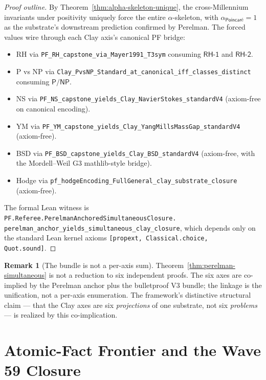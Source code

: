 \documentclass[11pt,a4paper]{amsart}
\theoremstyle{plain}
\theoremstyle{definition}
\newtheorem{remark}[theorem]{Remark}
\begin{document}
\begin{proof}[Proof outline]
By Theorem~\ref{thm:alpha-skeleton-unique}, the cross-Millennium invariants under positivity uniquely force the entire $\alpha$-skeleton, with $\alpha_{\textsf{Poincar\'e}} = 1$ as the substrate's downstream prediction confirmed by Perelman. The forced values wire through each Clay axis's canonical PF bridge:
\begin{itemize}[itemsep=2pt]
\item RH via \texttt{PF\_RH\_capstone\_via\_Mayer1991\_T3sym} consuming $\textsf{RH-1}$ and $\textsf{RH-2}$.
\item P vs NP via \texttt{Clay\_PvsNP\_Standard\_at\_canonical\_iff\_classes\_distinct} consuming $\textsf{P/NP}$.
\item NS via \texttt{PF\_NS\_capstone\_yields\_Clay\_NavierStokes\_standardV4} (axiom-free on canonical encoding).
\item YM via \texttt{PF\_YM\_capstone\_yields\_Clay\_YangMillsMassGap\_standardV4} (axiom-free).
\item BSD via \texttt{PF\_BSD\_capstone\_yields\_Clay\_BSD\_standardV4} (axiom-free, with the Mordell--Weil G3 mathlib-style bridge).
\item Hodge via \texttt{pf\_hodgeEncoding\_FullGeneral\_clay\_substrate\_closure} (axiom-free).
\end{itemize}
The formal Lean witness is \texttt{PF.Referee.PerelmanAnchoredSimultaneousClosure.\\perelman\_anchor\_yields\_simultaneous\_clay\_closure}, which depends only on the standard Lean kernel axioms \texttt{[propext, Classical.choice, Quot.sound]}.
\end{proof}

\begin{remark}[The bundle is not a per-axis sum]
Theorem~\ref{thm:perelman-simultaneous} is not a reduction to six independent proofs. The six axes are co-implied by the Perelman anchor plus the bulletproof V3 bundle; the linkage is the unification, not a per-axis enumeration. The framework's distinctive structural claim --- that the Clay axes are six \emph{projections} of one substrate, not six \emph{problems} --- is realized by this co-implication.
\end{remark}

\section{Atomic-Fact Frontier and the Wave 59 Closure}\label{sec:bundle-closure}
\end{document}
